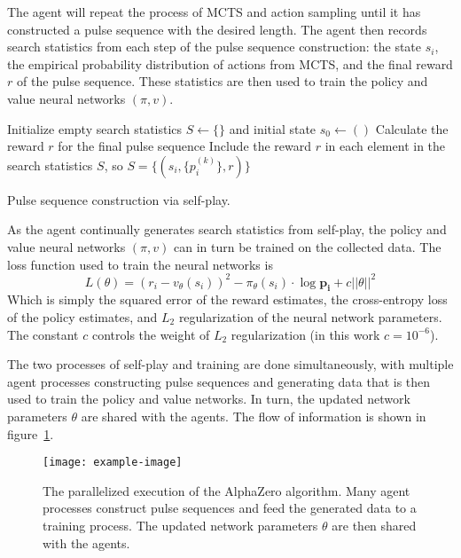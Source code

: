 The agent will repeat the process of MCTS and action sampling until it has constructed a pulse sequence with the desired length. The agent then records search statistics from each step of the pulse sequence construction: the state $s_i$, the empirical probability distribution of actions from MCTS, and the final reward $r$ of the pulse sequence. These statistics are then used to train the policy and value neural networks $(\pi, v)$.


\begin{algorithm}[H]
\BlankLine
Initialize empty search statistics $S \leftarrow \{\}$
and initial state $s_0 \leftarrow ()$
\;
Calculate the reward $r$ for the final pulse sequence \;
Include the reward $r$ in each element in the search statistics $S$, so $S = \{ (s_i, \{p_i^{(k)}\}, r) \}$ \;
\caption{Pulse sequence construction via self-play. \label{al:make_sequence}}
\end{algorithm}

As the agent continually generates search statistics from self-play, the policy and value neural networks $(\pi, v)$ can in turn be trained on the collected data. The loss function used to train the neural networks is
\begin{equation}\label{eq:az_loss}
    L(\theta) = (r_i - v_\theta(s_i))^2 - \pi_\theta(s_i) \cdot \log \mathbf{p_i} + c ||\theta||^2
\end{equation}
Which is simply the squared error of the reward estimates, the cross-entropy loss of the policy estimates, and $L_2$ regularization of the neural network parameters. The constant $c$ controls the weight of $L_2$ regularization (in this work $c = 10^{-6}$).

The two processes of self-play and training are done simultaneously, with multiple agent processes constructing pulse sequences and generating data that is then used to train the policy and value networks. In turn, the updated network parameters $\theta$ are shared with the agents. The flow of information is shown in figure~\ref{fig:az-parallel}.


\begin{figure}
    \centering
    \texttt{[image: example-image]}
    \caption{The parallelized execution of the AlphaZero algorithm. Many agent processes construct pulse sequences and feed the generated data to a training process. The updated network parameters $\theta$ are then shared with the agents.}
    \label{fig:az-parallel}
\end{figure}

